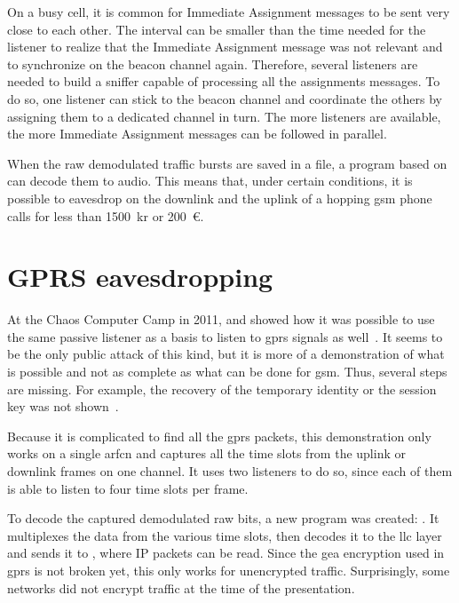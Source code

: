       On a busy cell, it is common for Immediate Assignment messages to
      be sent very close to each other. The interval can be smaller
      than the time needed for the listener to realize that the
      Immediate Assignment message was not relevant and to synchronize
      on the beacon channel again. Therefore, several listeners are
      needed to build a sniffer capable of processing all the
      assignments messages. To do so, one listener can stick to the
      beacon channel and coordinate the others by assigning them to a
      dedicated channel in turn. The more listeners are available, the
      more Immediate Assignment messages can be followed in parallel.

      When the raw demodulated traffic bursts are saved in a file, a
      program based on  can decode them to audio. This
      means that, under certain conditions, it is possible to eavesdrop
      on the downlink and the uplink of a hopping \gls{gsm} phone calls
      for less than \SI{1500}{kr} or \SI{200}{\euro}.

    \section{GPRS eavesdropping}

      At the Chaos Computer Camp in 2011,  and
       showed how it was possible to use the same
      passive listener as a basis to listen to \gls{gprs} signals as
      well~\cite{melette_gprs_2011}. It seems to be the only public
      attack of this kind, but it is more of a demonstration of what is
      possible and not as complete as what can be done for \gls{gsm}.
      Thus, several steps are missing. For example, the recovery of the
      temporary identity or the session key was not
      shown~\cite{srlabs_gprs_????}.

      Because it is complicated to find all the \gls{gprs} packets, this
      demonstration only works on a single \gls{arfcn} and captures all
      the time slots from the uplink or downlink frames on one channel.
      It uses two listeners to do so, since each of them is able to
      listen to four time slots per frame.

      To decode the captured demodulated raw bits, a new program was
      created: . It multiplexes the data from the
      various time slots, then decodes it to the \gls{llc} layer and
      sends it to , where IP packets can be read. Since
      the \gls{gea} encryption used in \gls{gprs} is not broken yet,
      this only works for unencrypted traffic. Surprisingly, some
      networks did not encrypt traffic at the time of the
      presentation.

